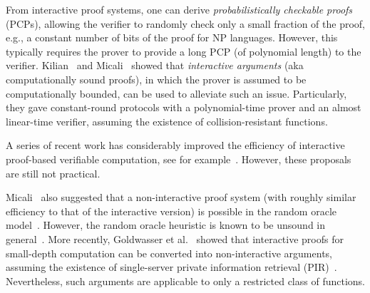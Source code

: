 From interactive proof systems, one can derive {\em probabilistically checkable proofs} (PCPs), allowing the verifier to randomly check only a small fraction of the proof, e.g., a constant number of bits of the proof for NP languages.
However, this typically requires the prover to provide a long PCP (of polynomial length) to the verifier.
Kilian~\cite{Kil92} and Micali~\cite{Mic94} showed that {\em interactive arguments} (aka computationally sound proofs), in which the prover is assumed to be computationally bounded, can be used to alleviate such an issue.
Particularly, they gave constant-round protocols with a polynomial-time prover and an almost linear-time verifier, assuming the existence of collision-resistant functions.

A series of recent work has considerably improved the efficiency of interactive proof-based verifiable computation, see for example~\cite{CMT12,SMB+12,SVP+12,TRM+12,VSB+13}.
However, these proposals are still not practical.

Micali~\cite{Mic94} also suggested that a non-interactive proof system (with roughly similar efficiency to that of the interactive version) is possible in the random oracle model~\cite{BR93}.
However, the random oracle heuristic is known to be unsound in general~\cite{CGH04}.
More recently, Goldwasser et al.~\cite{GKR08} showed that interactive proofs for small-depth computation can be converted into non-interactive arguments, assuming the existence of single-server private information retrieval (PIR)~\cite{CKG+98}.
Nevertheless, such arguments are applicable to only a restricted class of functions.

